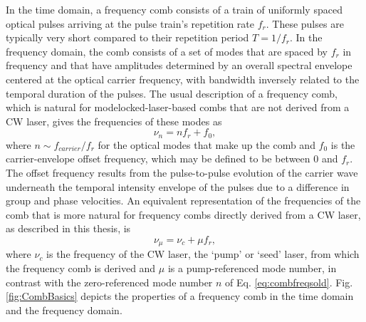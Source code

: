 In the time domain, a frequency comb consists of a train of uniformly spaced optical pulses arriving at the pulse train's repetition rate $f_r$. These pulses are typically very short compared to their repetition period $T=1/f_r$. In the frequency domain, the comb consists of a set of modes that are spaced by $f_r$ in frequency and that have amplitudes determined by an overall spectral envelope centered at the optical carrier frequency, with bandwidth inversely related to the temporal duration of the pulses. The usual description of a frequency comb, which is natural for modelocked-laser-based combs that are not derived from a CW laser, gives the frequencies of these modes as 
\begin{equation}
\nu_n=nf_r+f_0, \label{eq:combfreqsold}
\end{equation} 
where $n\sim f_{carrier}/f_r$ for the optical modes that make up the comb and $f_0$ is the carrier-envelope offset frequency, which may be defined to be between $0$ and $f_r$. The offset frequency results from the pulse-to-pulse evolution of the carrier wave underneath the temporal intensity envelope of the pulses due to a difference in group and phase velocities. An equivalent representation of the frequencies of the comb that is more natural for frequency combs directly derived from a CW laser, as described in this thesis, is
\begin{equation}
\nu_\mu=\nu_c+\mu f_r, \label{eq:combfreqsnew}
\end{equation} 
where $\nu_c$ is the frequency of the CW laser, the `pump' or `seed' laser, from which the frequency comb is derived and $\mu$ is a pump-referenced mode number, in contrast with the zero-referenced mode number $n$ of Eq. \ref{eq:combfreqsold}. Fig. \ref{fig:CombBasics} depicts the properties of a frequency comb in the time domain and the frequency domain.

